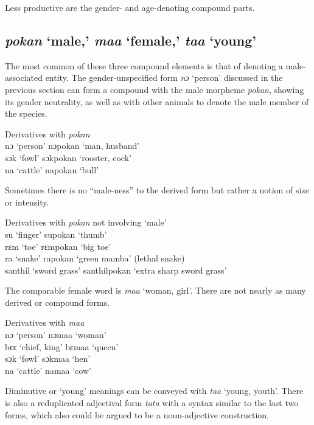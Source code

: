 Less productive are the gender- and age-denoting compound parts.

\subsection{\textit{pokan} ‘male,' \textit{maa} ‘female,' \textit{taa} ‘young'}
\label{sec:7.3.2}\hypertarget{Toc115517809}{}
The most common of these three compound elements is that of denoting a male-associated entity. The gender-unspecified form \textit{nɔ} ‘person' discussed in the previous section can form a compound with the male morpheme \textit{pokan}, showing its gender neutrality, as well as with other animals to denote the male member of the species.


\ea%
    \label{ex:182} Derivatives with \textit{pokan}\\
    
    nɔ \tab ‘person' \tab nɔpokan \tab ‘man, husband'\\
    sɔk \tab ‘fowl' \tab sɔkpokan \tab ‘rooster, cock'\\
    na \tab ‘cattle' \tab napokan \tab ‘bull'
\z

Sometimes there is no “male-ness” to the derived form but rather a notion of size or intensity.

\ea%
    \label{ex:183} Derivatives with \textit{pokan} not involving ‘male'\\
   su \tab ‘finger' \tab supokan \tab \tab ‘thumb'\\
   rɛm \tab ‘toe' \tab rɛmpokan \tab \tab ‘big toe'\\
   ra \tab ‘snake' \tab rapokan \tab \tab ‘green mamba' (lethal snake)\\
   santhil \tab ‘sword grass' \tab santhilpokan \tab ‘extra sharp sword grass'
\z

The comparable female word is \textit{maa} ‘woman, girl'. There are not nearly as many derived or compound forms.

\ea%
    \label{ex:184} Derivatives with \textit{maa}\\
    nɔ \tab ‘person' \tab nɔmaa \tab ‘woman'\\
    bɛɛ \tab ‘chief, king' \tab bɛmaa \tab ‘queen'\\
    sɔk \tab ‘fowl' \tab sɔkmaa \tab ‘hen'\\
    na \tab ‘cattle' \tab namaa \tab ‘cow'
\z

Diminutive or ‘young' meanings can be conveyed with \textit{taa} ‘young, youth'. There is also a reduplicated adjectival form \textit{tata} with a syntax similar to the last two forms, which also could be argued to be a noun-adjective construction.

